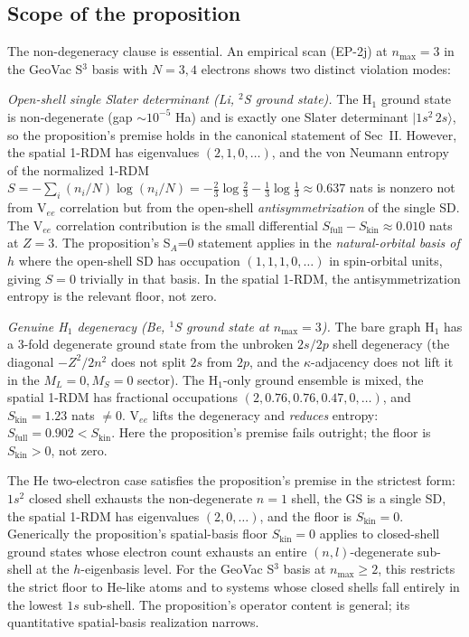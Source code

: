 \documentclass[twocolumn,pra,amsmath,amssymb,superscriptaddress]{revtex4-2}
\begin{document}
\subsection{Scope of the proposition}
\label{sec:scope}

The non-degeneracy clause is essential.  An empirical scan
(EP-2j) at $n_{\max}=3$ in the GeoVac S$^{3}$ basis with
$N=3,4$ electrons shows two distinct violation modes:

\emph{Open-shell single Slater determinant (Li, $^{2}$S
ground state).}  The H$_{1}$ ground state is non-degenerate
(gap $\sim 10^{-5}$ Ha) and is exactly one Slater determinant
$|1s^{2}\,2s\rangle$, so the proposition's premise holds in
the canonical statement of Sec~II.  However, the spatial
1-RDM has eigenvalues $(2, 1, 0, \ldots)$, and the von
Neumann entropy of the normalized 1-RDM
$S = -\sum_i (n_i/N)\log(n_i/N) = -\tfrac{2}{3}\log\tfrac{2}{3}
- \tfrac{1}{3}\log\tfrac{1}{3} \approx 0.637$ nats is nonzero
not from V$_{ee}$ correlation but from the open-shell
\emph{antisymmetrization} of the single SD.  The V$_{ee}$
correlation contribution is the small differential
$S_{\mathrm{full}} - S_{\mathrm{kin}} \approx 0.010$ nats at
$Z=3$.  The proposition's S$_A$=0 statement applies in the
\emph{natural-orbital basis of $h$} where the open-shell SD
has occupation $(1, 1, 1, 0, \ldots)$ in spin-orbital units,
giving $S=0$ trivially in that basis.  In the spatial 1-RDM,
the antisymmetrization entropy is the relevant floor, not
zero.

\emph{Genuine H$_{1}$ degeneracy (Be, $^{1}$S ground state at
$n_{\max}=3$).}  The bare graph H$_{1}$ has a 3-fold
degenerate ground state from the unbroken $2s/2p$ shell
degeneracy (the diagonal $-Z^{2}/2n^{2}$ does not split
$2s$ from $2p$, and the $\kappa$-adjacency does not lift it
in the $M_L=0, M_S=0$ sector).  The H$_{1}$-only ground
ensemble is mixed, the spatial 1-RDM has fractional
occupations $(2, 0.76, 0.76, 0.47, 0, \ldots)$, and
$S_{\mathrm{kin}} = 1.23$ nats $\neq 0$.  V$_{ee}$ lifts the
degeneracy and \emph{reduces} entropy:
$S_{\mathrm{full}} = 0.902 < S_{\mathrm{kin}}$.  Here the
proposition's premise fails outright; the floor is
$S_{\mathrm{kin}}>0$, not zero.

The He two-electron case satisfies the proposition's premise
in the strictest form: $1s^{2}$ closed shell exhausts the
non-degenerate $n=1$ shell, the GS is a single SD, the
spatial 1-RDM has eigenvalues $(2, 0, \ldots)$, and the
floor is $S_{\mathrm{kin}}=0$.  Generically the
proposition's spatial-basis floor $S_{\mathrm{kin}}=0$
applies to closed-shell ground states whose electron count
exhausts an entire $(n,l)$-degenerate sub-shell at the
$h$-eigenbasis level.  For the GeoVac S$^{3}$ basis at
$n_{\max}\geq 2$, this restricts the strict floor to
He-like atoms and to systems whose closed shells fall
entirely in the lowest $1s$ sub-shell.  The proposition's
operator content is general; its quantitative spatial-basis
realization narrows.
\end{document}
